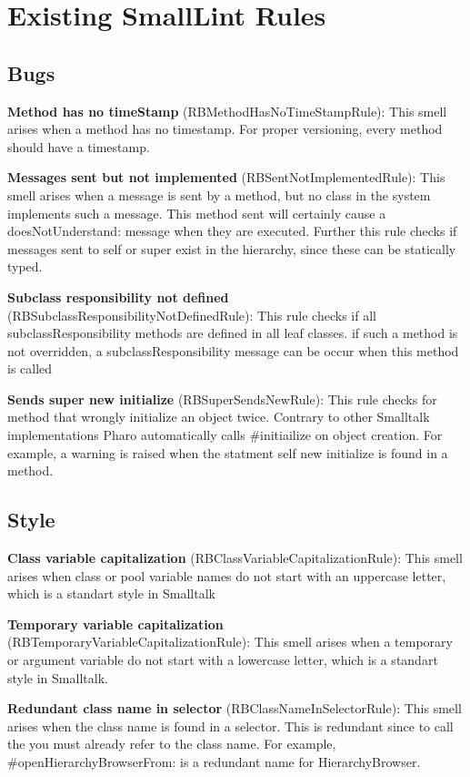 \section{Existing SmallLint Rules}
\subsection{Bugs}
\textbf{Method has no timeStamp} (RBMethodHasNoTimeStampRule): This smell arises when a method has no timestamp. For proper versioning, every method should have a timestamp.

\textbf{Messages sent but not implemented} (RBSentNotImplementedRule): This smell arises when a message is sent by a method,  but no class in the system implements such a message. This method sent will certainly cause a doesNotUnderstand: message when they are executed.  Further this rule checks if messages sent to self or super exist in the hierarchy, since these can be statically typed.

\textbf{Subclass responsibility not defined} (RBSubclassResponsibilityNotDefinedRule): This rule checks if all subclassResponsibility methods are defined in all leaf classes. if such a method is not overridden, a subclassResponsibility message can be occur when this method is called

\textbf{Sends super new initialize} (RBSuperSendsNewRule):  This rule checks for method that wrongly initialize an object twice. Contrary to other Smalltalk implementations Pharo automatically calls \#initiailize on object creation.
For example, a warning is raised when the statment self new initialize is found in a method.

\subsection{Style}
\textbf{Class variable capitalization} (RBClassVariableCapitalizationRule): This smell arises when class or pool variable names do not start with an uppercase letter, which is a standart style in Smalltalk

\textbf{Temporary variable capitalization} (RBTemporaryVariableCapitalizationRule): This smell arises when a temporary or argument variable do not start with a lowercase letter, which is a standart style in Smalltalk.

\textbf{Redundant class name in selector} (RBClassNameInSelectorRule): This smell arises when the class name is found in a selector. This is redundant since to call the you must already refer to the class name. For example, \#openHierarchyBrowserFrom: is a redundant name for HierarchyBrowser.


